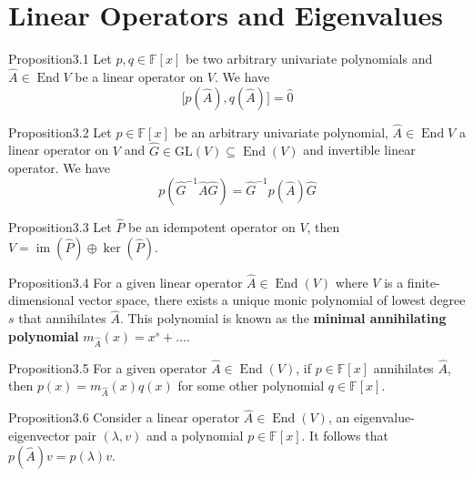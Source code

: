 \section{Linear Operators and Eigenvalues}

\begin{res}{Proposition}{3.1}
Let $p,q\in\mathbb F[x]$ be two arbitrary univariate polynomials and $\hat A\in\operatorname{End}V$ be a linear operator on $V$. We have
\begin{equation}\bigl[p(\hat A),q(\hat A)\bigr]=\hat 0\tag{3.4}\end{equation}
\end{res}

\begin{res}{Proposition}{3.2}
Let $p\in\mathbb F[x]$ be an arbitrary univariate polynomial, $\hat A\in\operatorname{End}V$ a linear operator on $V$ and $\hat G\in\mathrm{GL}(V)\subseteq\operatorname{End}(V)$ and invertible linear operator. We have
\begin{equation}p(\hat G^{-1}\hat A\hat G)=\hat G^{-1}p(\hat A)\hat G\tag{3.5}\end{equation}
\end{res}

\begin{res}{Proposition}{3.3}
Let $\hat P$ be an idempotent operator on $V$, then $V=\operatorname{im}(\hat P)\oplus\ker(\hat P)$.
\end{res}

\begin{res}{Proposition}{3.4}
For a given linear operator $\hat A\in\operatorname{End}(V)$ where $V$ is a finite-dimensional vector space, there exists a unique monic polynomial of lowest degree $s$ that annihilates $\hat A$. This polynomial is known as the \textbf{minimal annihilating polynomial} $m_{\hat A}(x)=x^s+\dots$.
\end{res}

\begin{res}{Proposition}{3.5}
For a given operator $\hat A\in\operatorname{End}(V)$, if $p\in\mathbb F[x]$ annihilates $\hat A$, then $p(x)=m_{\hat A}(x)q(x)$ for some other polynomial $q\in\mathbb F[x]$.
\end{res}

\begin{res}{Proposition}{3.6}
Consider a linear operator $\hat A\in\operatorname{End}(V)$, an eigenvalue-eigenvector pair $(\lambda,v)$ and a polynomial $p\in\mathbb F[x]$. It follows that $p(\hat A)v=p(\lambda)v$.
\end{res}

